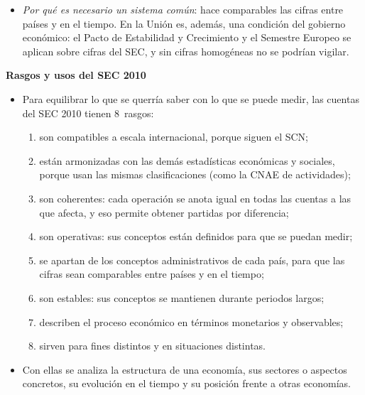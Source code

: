 \documentclass[11pt]{article}
\begin{document}
\begin{itemize}
\begin{itemize}
  \item La Unión lo trasladará con un nuevo SEC, que Eurostat llama provisionalmente SEC 2030.
  \item La Comisión debe proponerlo a finales de 2026, y los cambios principales se aplicarán desde 2030\nocite{Eurostat2026ESA2030,Verrinder2026SCN2025}.
  \item Hasta entonces, las cuentas españolas siguen el SEC 2010, que el INE aplica desde septiembre de 2014\nocite{INE2014Base2010}.
  \end{itemize}
\item \emph{Por qué es necesario un sistema común}: hace comparables las cifras entre países y en el tiempo. En la Unión es, además, una condición del gobierno económico: el Pacto de Estabilidad y Crecimiento y el Semestre Europeo se aplican sobre cifras del SEC, y sin cifras homogéneas no se podrían vigilar.
\end{itemize}

\begin{anotaciones}
\textbf{Rasgos y usos del SEC 2010}
\begin{itemize}
\item Para equilibrar lo que se querría saber con lo que se puede medir, las cuentas del SEC 2010 tienen 8~rasgos\nocite{SEC2010}:
  \begin{enumerate}
  \item son compatibles a escala internacional, porque siguen el SCN;
  \item están armonizadas con las demás estadísticas económicas y sociales, porque usan las mismas clasificaciones (como la CNAE de actividades);
  \item son coherentes: cada operación se anota igual en todas las cuentas a las que afecta, y eso permite obtener partidas por diferencia;
  \item son operativas: sus conceptos están definidos para que se puedan medir;
  \item se apartan de los conceptos administrativos de cada país, para que las cifras sean comparables entre países y en el tiempo;
  \item son estables: sus conceptos se mantienen durante periodos largos;
  \item describen el proceso económico en términos monetarios y observables;
  \item sirven para fines distintos y en situaciones distintas.
  \end{enumerate}
\item Con ellas se analiza la estructura de una economía, sus sectores o aspectos concretos, su evolución en el tiempo y su posición frente a otras economías.
\end{itemize}
\end{anotaciones}
\end{document}
